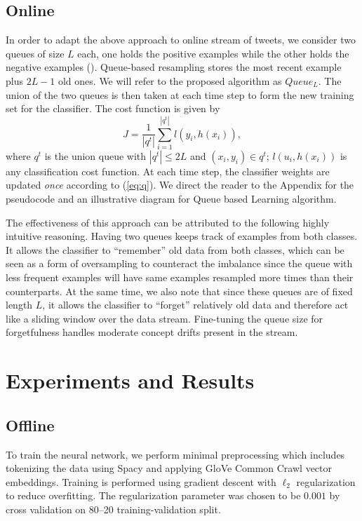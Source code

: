 \documentclass{article}
\begin{document}
  \subsection{Online}
  In order to adapt the above approach to online stream of tweets, we consider two queues of size \(L\)
  each, one holds the positive examples while the other holds the negative examples (\cite{Malialis2018QueueBasedRF}). Queue-based resampling stores the most recent example plus
  \(2L-1\) old ones. We will refer to the proposed algorithm as \(Queue_L\). The union of the two queues is then taken at each
  time step to form the new training set for the classifier. The cost function is given by
  \begin{equation} \label{eq:q}
      J=\frac{1}{|q^t|}\sum_{i=1}^{|q^t|} l(y_i, h(x_i)),
  \end{equation}
  where \(q^t\) is the union queue with \(|q^t|\leq 2L\) and \((x_i, y_i)\in q^t\); \(l(u_i, h(x_i))\) is any classification cost function. At each time step, the
  classifier weights are updated \textit{once} according to (\ref{eq:q}).  We direct the reader to the Appendix for the pseudocode and an illustrative diagram for Queue based Learning algorithm.

  The effectiveness of this approach can be attributed to the following highly intuitive reasoning. Having two queues keeps track of
  examples from both classes. It allows the classifier to ``remember'' old data from both classes, which can be seen as a form of oversampling to counteract the imbalance since the
  queue with less frequent examples will have same examples resampled more times than their counterparts. At the same time, we also note that since these queues are of
  fixed length \(L\), it allows the classifier to ``forget'' relatively old data and therefore act like a sliding window over the data stream. Fine-tuning the queue size for forgetfulness
  handles moderate concept drifts present in the stream.

  \section{Experiments and Results}
  \subsection{Offline}
  To train the neural network, we perform minimal preprocessing which includes tokenizing the data using Spacy and applying GloVe Common Crawl vector embeddings. 
  Training is performed using gradient descent with \(\ell_2\) regularization to reduce overfitting. The regularization parameter
  was chosen to be \(0.001\) by cross validation on 80--20 training-validation split.
  
\end{document}
